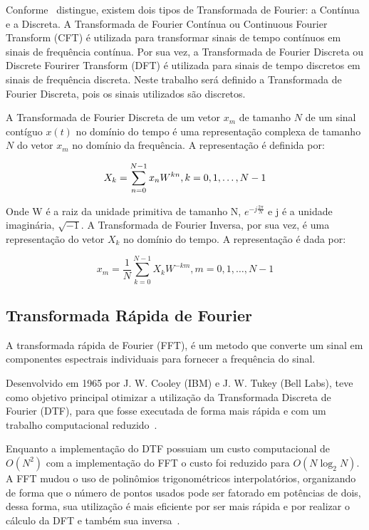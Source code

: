 \documentclass{sbrt}
\begin{document}
Conforme~\cite{richardson1978fundamentals} distingue, existem dois tipos de Transformada de Fourier: a Contínua e a
Discreta. A Transformada de Fourier Contínua ou Continuous Fourier Transform (CFT) é utilizada para transformar sinais
de tempo contínuos em sinais de frequência contínua. Por sua vez, a Transformada de Fourier Discreta ou Discrete
Fourirer Transform (DFT) é utilizada para sinais de tempo discretos em sinais de frequência discreta. Neste trabalho
será definido a Transformada de Fourier Discreta, pois os sinais utilizados são discretos.

A Transformada de Fourier Discreta de um vetor $x_m$ de tamanho $N$ de um sinal contíguo $x(t)$ no domínio do tempo é
uma representação complexa de tamanho $N$ do vetor $x_m$ no domínio da frequência. A representação é definida por:

\begin{equation} \label{eq:fourier}
  {X_k} = \sum_{n=0}^{N-1} x_n W^{kn}, k = 0, 1, \dots, N-1 \\
\end{equation}

Onde W é a raiz da unidade primitiva de tamanho N, $e^{-j \frac{2\pi}{N}}$ e j é a unidade imaginária, $\sqrt{-1}$. A
Transformada de Fourier Inversa, por sua vez, é uma representação do vetor $X_k$ no domínio do tempo. A representação é
dada por:

\begin{equation} \label{eq:fourier_inv}
  x_m = \frac{1}{N} \sum_{k=0}^{N-1} {X_k} W^{-km}, m = 0, 1, \dots, N-1
\end{equation}

\subsection{Transformada Rápida de Fourier}

A transformada rápida de Fourier (FFT), é um metodo que  converte um sinal em componentes espectrais individuais para
fornecer a frequência do sinal.

Desenvolvido em 1965 por  J. W. Cooley (IBM) e J. W. Tukey (Bell Labs), teve como objetivo principal otimizar a
utilização da Transformada Discreta de Fourier (DTF), para que fosse executada de forma mais rápida e com um trabalho
computacional reduzido~\cite{martins2016analise}.

Enquanto a implementação do DTF possuiam um custo computacional de $O(N^2)$ com a implementação do FFT o custo foi
reduzido para $O(N \log_2{N})$. A FFT mudou o uso de polinômios trigonométricos interpolatórios, organizando de forma
que o número de pontos usados pode ser fatorado em potências de dois, dessa forma, sua utilização é mais eficiente por
ser mais rápida e por realizar o cálculo da DFT e também sua inversa~\cite{reis2008implementaccao}.
\end{document}
